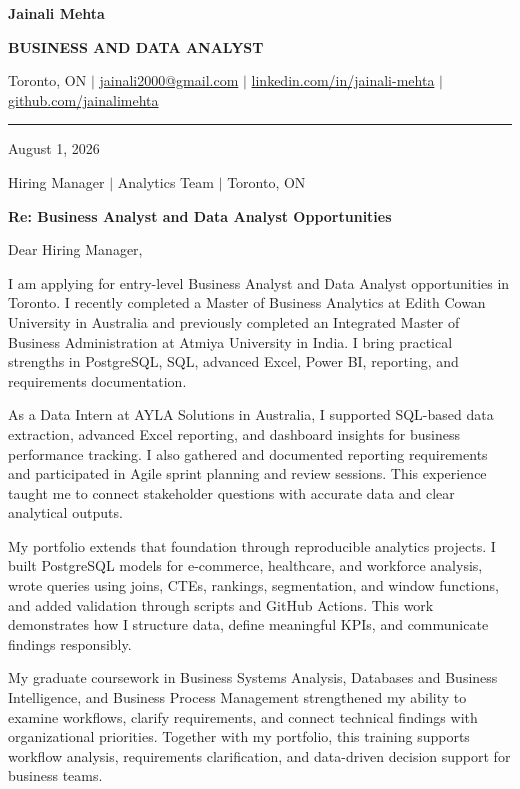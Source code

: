 \documentclass[letterpaper,10pt]{article}
\begin{document}
\fontsize{10.5}{13}\selectfont

{\fontsize{22}{24}\selectfont\bfseries\color{navy} Jainali Mehta}\par
{\fontsize{9.5}{11}\selectfont\bfseries\color{navy} BUSINESS AND DATA ANALYST}\par
\vspace{1pt}
{\small Toronto, ON $\vert$ \href{mailto:jainali2000@gmail.com}{jainali2000@gmail.com} $\vert$ \href{https://www.linkedin.com/in/jainali-mehta}{linkedin.com/in/jainali-mehta} $\vert$ \href{https://github.com/jainalimehta}{github.com/jainalimehta}}\par
\vspace{2pt}
{\color{navy}\rule{\textwidth}{0.8pt}}

August 1, 2026

Hiring Manager $\vert$ Analytics Team $\vert$ Toronto, ON

{\bfseries\color{navy} Re: Business Analyst and Data Analyst Opportunities}

Dear Hiring Manager,

I am applying for entry-level Business Analyst and Data Analyst opportunities in Toronto. I recently completed a Master of Business Analytics at Edith Cowan University in Australia and previously completed an Integrated Master of Business Administration at Atmiya University in India. I bring practical strengths in PostgreSQL, SQL, advanced Excel, Power BI, reporting, and requirements documentation.

As a Data Intern at AYLA Solutions in Australia, I supported SQL-based data extraction, advanced Excel reporting, and dashboard insights for business performance tracking. I also gathered and documented reporting requirements and participated in Agile sprint planning and review sessions. This experience taught me to connect stakeholder questions with accurate data and clear analytical outputs.

My portfolio extends that foundation through reproducible analytics projects. I built PostgreSQL models for e-commerce, healthcare, and workforce analysis, wrote queries using joins, CTEs, rankings, segmentation, and window functions, and added validation through scripts and GitHub Actions. This work demonstrates how I structure data, define meaningful KPIs, and communicate findings responsibly.

My graduate coursework in Business Systems Analysis, Databases and Business Intelligence, and Business Process Management strengthened my ability to examine workflows, clarify requirements, and connect technical findings with organizational priorities. Together with my portfolio, this training supports workflow analysis, requirements clarification, and data-driven decision support for business teams.
\end{document}
